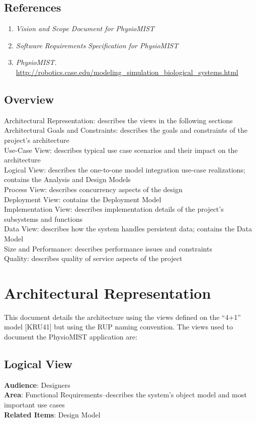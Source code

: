 \documentclass{article}
\begin{document}
\subsection{References}
\begin{enumerate}
\item \emph{Vision and Scope Document for PhysioMIST}
\item \emph{Software Requirements Specification for PhysioMIST}
\item \emph{PhysioMIST.} \url{http://robotics.case.edu/modeling_simulation_biological_systems.html}
\end{enumerate}
\subsection{Overview}
Architectural Representation: describes the views in the following sections\\
Architectural Goals and Constraints: describes the goals and constraints of the project's architecture\\
Use-Case View: describes typical use case scenarios and their impact on the architecture\\
Logical View: describes the one-to-one model integration use-case realizations; contains the Analysis and Design Models\\
Process View: describes concurrency aspects of the design\\
Deployment View: contains the Deployment Model\\
Implementation View: describes implementation details of the project's subsystems and functions\\
Data View: describes how the system handles persistent data; contains the Data Model\\
Size and Performance: describes performance issues and constraints\\
Quality: describes quality of service aspects of the project

\section{Architectural Representation}
This document details the architecture using the views defined on the ``4+1'' model [KRU41] but using the RUP naming convention.
The views used to document the PhysioMIST application are:
\subsection{Logical View}
\textbf{Audience}: Designers\\
\textbf{Area}: Functional Requirements--describes the system's object model and most important use cases\\
\textbf{Related Items}: Design Model
\end{document}
